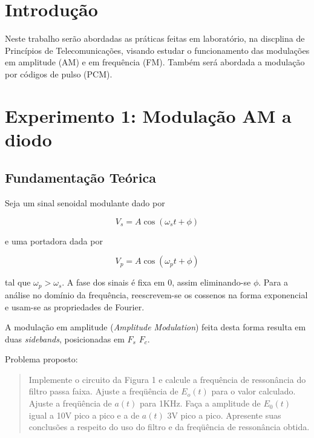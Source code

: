 \documentclass[]{report}
\title{}
\author{Renan Birck Pinheiro}
\begin{document}

\tableofcontents

\chapter{Introdução}
Neste trabalho serão abordadas as práticas feitas em laboratório, na discplina de Princípios de Telecomunicações, visando estudar o funcionamento das modulações em amplitude (AM) e em frequência (FM). Também será abordada a modulação por códigos de pulso (PCM). 

\chapter{Experimento 1: Modulação AM a diodo}
\section{Fundamentação Teórica}
Seja um sinal senoidal modulante dado por 

\begin{equation}\label{eq_modulante}
V_s = A \cos(\omega_s t + \phi)
\end{equation}

e uma portadora dada por

\begin{equation}\label{eq_portadora}
V_p = A \cos(\omega_p t + \phi)
\end{equation}

tal que $\omega_p > \omega_s$. A fase dos sinais é fixa em 0, assim eliminando-se $\phi$. Para a análise no domínio da frequência, reescrevem-se os cossenos na forma exponencial e usam-se as propriedades de Fourier.

A modulação em amplitude (\textit{Amplitude Modulation}) feita desta forma resulta em duas \textit{sidebands}, posicionadas em $F_s$ \textpm $F_c$.

Problema proposto:
\begin{quote}
Implemente o circuito da Figura 1 e calcule a frequência de ressonância do filtro passa faixa. Ajuste a freqüência de $E_o(t)$ para o valor calculado. Ajuste a freqüência de $a(t)$ para 1KHz. Faça a amplitude de $E_0(t)$ igual a 10V pico a pico e a de $a(t)$ 3V pico a pico. Apresente suas conclusões a respeito do uso do filtro e da freqüência de ressonância obtida.
\end{quote}
\end{document}
